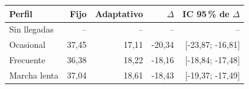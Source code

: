 \begin{tabular}{lrrrr}
\toprule
Perfil & Fijo & Adaptativo & $\Delta$ & IC 95\,\% de $\Delta$\\\midrule
Sin llegadas & -- & -- & -- & --\\
Ocasional & 37,45 & 17,11 & -20,34 & [-23,87; -16,81]\\
Frecuente & 36,38 & 18,22 & -18,16 & [-18,84; -17,48]\\
Marcha lenta & 37,04 & 18,61 & -18,43 & [-19,37; -17,49]\\
\bottomrule
\end{tabular}
